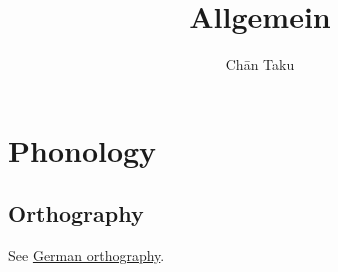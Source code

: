 \documentclass{article}
\title{Allgemein}
\author{Ch\=an Taku}
\begin{document}
\maketitle

% 
% 

\section{Phonology}

\subsection{Orthography}

See \href{https://en.wikipedia.org/wiki/German_orthography}{German orthography}.
\end{document}

